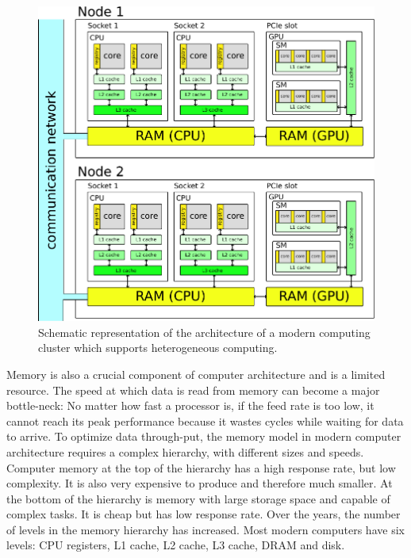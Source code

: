 \begin{figure}
\centering
\includegraphics[scale=1.0]{Pics/memory}
\caption{Schematic representation of the architecture of a modern computing cluster which supports heterogeneous computing.}
\label{clusterArchitecture}
\end{figure}

Memory is also a crucial component of computer architecture and is a limited resource. The speed at which data is read from memory can become a major bottle-neck: No matter how fast a processor is, if the feed rate is too low, it cannot reach its peak performance because it wastes cycles while waiting for data to arrive. To optimize data through-put, the memory model in modern computer architecture requires a complex hierarchy, with different sizes and speeds. Computer memory at the top of the hierarchy has a high response rate, but low complexity. It is also very expensive to produce and therefore much smaller. At the bottom of the hierarchy is memory with large storage space and capable of complex tasks. It is cheap but has low response rate. Over the years, the number of levels in the memory hierarchy has increased. Most modern computers have six levels: CPU registers, L1 cache, L2 cache, L3 cache, DRAM and disk. 

